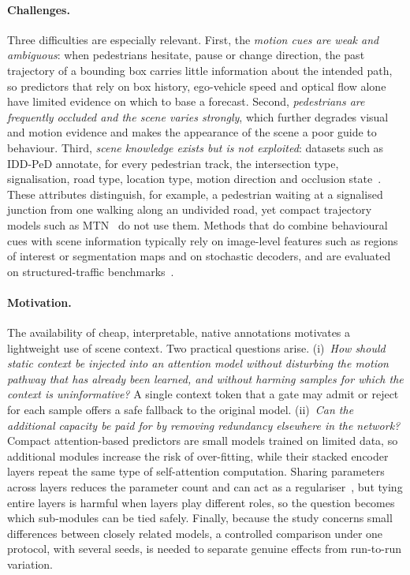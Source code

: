 \paragraph{Challenges.} Three difficulties are especially relevant. First, the \emph{motion cues are weak and ambiguous}: when pedestrians hesitate, pause or change direction, the past trajectory of a bounding box carries little information about the intended path, so predictors that rely on box history, ego-vehicle speed and optical flow alone have limited evidence on which to base a forecast. Second, \emph{pedestrians are frequently occluded and the scene varies strongly}, which further degrades visual and motion evidence and makes the appearance of the scene a poor guide to behaviour. Third, \emph{scene knowledge exists but is not exploited}: datasets such as IDD-PeD annotate, for every pedestrian track, the intersection type, signalisation, road type, location type, motion direction and occlusion state~\citep{iddped2025}. These attributes distinguish, for example, a pedestrian waiting at a signalised junction from one walking along an undivided road, yet compact trajectory models such as MTN~\citep{yin2021mtn} do not use them. Methods that do combine behavioural cues with scene information typically rely on image-level features such as regions of interest or segmentation maps and on stochastic decoders, and are evaluated on structured-traffic benchmarks~\citep{rasouli2022pedformer,sharma2025dual}.

\paragraph{Motivation.} The availability of cheap, interpretable, native annotations motivates a lightweight use of scene context. Two practical questions arise. (i)~\emph{How should static context be injected into an attention model without disturbing the motion pathway that has already been learned, and without harming samples for which the context is uninformative?} A single context token that a gate may admit or reject for each sample offers a safe fallback to the original model. (ii)~\emph{Can the additional capacity be paid for by removing redundancy elsewhere in the network?} Compact attention-based predictors are small models trained on limited data, so additional modules increase the risk of over-fitting, while their stacked encoder layers repeat the same type of self-attention computation. Sharing parameters across layers reduces the parameter count and can act as a regulariser~\citep{dehghani2019universal,lan2020albert}, but tying entire layers is harmful when layers play different roles, so the question becomes which sub-modules can be tied safely. Finally, because the study concerns small differences between closely related models, a controlled comparison under one protocol, with several seeds, is needed to separate genuine effects from run-to-run variation.

